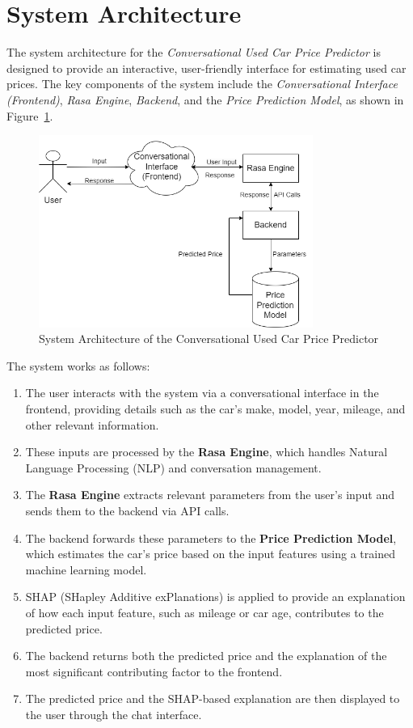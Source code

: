 \documentclass[a4paper,12pt]{article}
\begin{document}
\section{System Architecture}
The system architecture for the \textit{Conversational Used Car Price Predictor} is designed to provide an interactive, user-friendly interface for estimating used car prices. The key components of the system include the \textit{Conversational Interface (Frontend)}, \textit{Rasa Engine}, \textit{Backend}, and the \textit{Price Prediction Model}, as shown in Figure~\ref{fig:architecture}.

\begin{figure}[h]
    \centering
    \includegraphics[width=0.8\textwidth]{Midsem.drawio.png}
    \caption{System Architecture of the Conversational Used Car Price Predictor}
    \label{fig:architecture}
\end{figure}

The system works as follows:
\begin{enumerate}
    \item The user interacts with the system via a conversational interface in the frontend, providing details such as the car’s make, model, year, mileage, and other relevant information.
    \item These inputs are processed by the \textbf{Rasa Engine}, which handles Natural Language Processing (NLP) and conversation management.
    \item The \textbf{Rasa Engine} extracts relevant parameters from the user's input and sends them to the backend via API calls.
    \item The backend forwards these parameters to the \textbf{Price Prediction Model}, which estimates the car's price based on the input features using a trained machine learning model.
    \item SHAP (SHapley Additive exPlanations) is applied to provide an explanation of how each input feature, such as mileage or car age, contributes to the predicted price.
    \item The backend returns both the predicted price and the explanation of the most significant contributing factor to the frontend.
    \item The predicted price and the SHAP-based explanation are then displayed to the user through the chat interface.
\end{enumerate}
\end{document}
